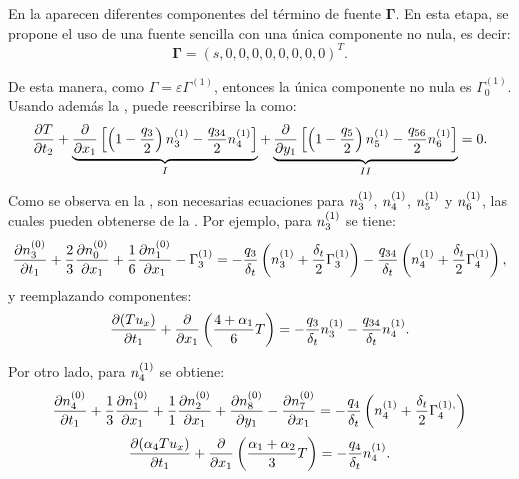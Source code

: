 En la  aparecen diferentes componentes del t\'ermino de fuente $\bm{\Gamma}$. En esta etapa, se propone el uso de una fuente sencilla con una \'unica componente no nula, es decir:
\begin{equation}
	\bm{\Gamma} = (s,0,0,0,0,0,0,0,0)^T.	
\end{equation}

De esta manera, como $\Gamma = \varepsilon \Gamma^{(1)}$, entonces la \'unica componente no nula es $\Gamma_0^{(1)}$. Usando adem\'as la , puede reescribirse la  como:
\begin{equation}
	\dfrac{\partial T}{\partial t_2} + 
	\underbrace{\dfrac{\partial}{\partial x_1}\left[ \left( 1-\dfrac{q_3}{2} \right) n_{3}^{(1)} - \dfrac{q_{34}}{2} n_{4}^{(1)} \right]}_{I} 	+  \underbrace{ \dfrac{\partial}{\partial y_1}\left[ \left( 1-\dfrac{q_5}{2} \right) n_{5}^{(1)} - \dfrac{q_{56}}{2}  n_{6}^{(1)} \right]}_{II} = 0	.
	\label{eq:eps_2_reduced}
\end{equation}

Como se observa en la , son necesarias ecuaciones para $n_{3}^{(1)}$, $n_{4}^{(1)}$, $n_{5}^{(1)}$ y $n_{6}^{(1)}$, las cuales pueden obtenerse de la . Por ejemplo, para $n_{3}^{(1)}$ se tiene:
\begin{equation}
	\dfrac{\partial n_{3}^{(0)}}{\partial t_1} + \dfrac{2}{3}\dfrac{\partial n_{0}^{(0)}}{\partial x_1} + \dfrac{1}{6}\dfrac{\partial n_{1}^{(0)}}{\partial x_1} - \Gamma_3^{(1)} = -\dfrac{q_3}{\delta_t} \left( n_{3}^{(1)} +\dfrac{\delta_t}{2} \Gamma_3^{(1)}\right) - \dfrac{q_{34}}{\delta_t} \left( n_{4}^{(1)} +\dfrac{\delta_t}{2} \Gamma_4^{(1)}\right),
\end{equation}
y reemplazando componentes:
\begin{equation}
	\dfrac{\partial (Tu_x)}{\partial t_1} + \dfrac{\partial}{\partial x_1} \left(\dfrac{4+\alpha_1}{6} T \right) = -\dfrac{q_3}{\delta_t} n_{3}^{(1)} - \dfrac{q_{34}}{\delta_t} n_{4}^{(1)}.
	\label{eq:n3_2d}
\end{equation}

Por otro lado, para $n_{4}^{(1)}$ se obtiene:
\begin{equation}
	\dfrac{\partial n_{4}^{(0)}}{\partial t_1} + \dfrac{1}{3}\dfrac{\partial n_{1}^{(0)}}{\partial x_1} + \dfrac{1}{1}\dfrac{\partial n_{2}^{(0)}}{\partial x_1}  + \dfrac{\partial n_{8}^{(0)}}{\partial y_1} - \dfrac{\partial n_{7}^{(0)}}{\partial x_1}	
	= -\dfrac{q_4}{\delta_t} \left( n_{4}^{(1)} +\dfrac{\delta_t}{2} \Gamma_4^{(1),}\right)
\end{equation}
\begin{equation}
	\dfrac{\partial (\alpha_4 Tu_x)}{\partial t_1} + \dfrac{\partial}{\partial x_1} \left(\dfrac{\alpha_1 + \alpha_2}{3} T \right) = -\dfrac{q_4}{\delta_t} n_{4}^{(1)}.
	\label{eq:n4_2d}
\end{equation}

